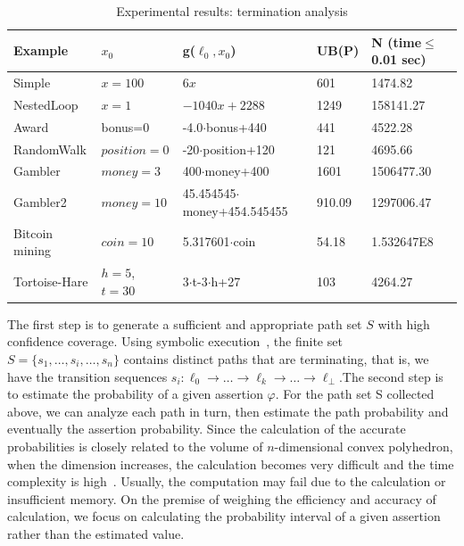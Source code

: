 \documentclass[sigconf,review, anonymous]{acmart}
\begin{document}
\begin{table}[htb]
	\caption{Experimental results: termination analysis}  
	\label{TerminationResult} 
	\begin{center}  
		\begin{tabular}{|l|l|l|l|l|}  
			\hline  	
			Example & $x_0$ & g($\ell_0,x_0$) & UB(P) & N (time$\leq$0.01 sec)\\ \hline  	
			Simple & $x=100$  & $6x$ & 601 & 1474.82 \\ \hline  		
			NestedLoop & $x=1$ & $-1040x+2288$ & 1249 & 158141.27 \\  \hline  
			Award & bonus=0 & -4.0$\cdot$bonus+440& 441 &4522.28 \\  \hline  
			RandomWalk & $position=0$ & -20$\cdot$position+120 & 121 & 4695.66 \\  \hline  
			Gambler& $money=3$ & 400$\cdot$money+400& 1601 & 1506477.30 \\ \hline  		 
			Gambler2 & $money=10$ & 45.454545$\cdot$money+454.545455 & 910.09 & 1297006.47 \\  \hline  
			Bitcoin mining & $coin=10$ & 5.317601$\cdot$coin & 54.18 & 1.532647E8 \\  \hline 
			Tortoise-Hare & $h=5$, $t=30$ & 3$\cdot$t-3$\cdot$h+27 & 103 & 4264.27 \\  \hline  
		\end{tabular}  
	\end{center}  
\end{table}

The first step is to generate a sufficient and appropriate path set $S$ with high confidence coverage. Using symbolic execution~\cite{Geldenhuys2012symbolic}, the finite set $S=\{s_1,\dots,s_i,\dots,s_n\}$ contains distinct paths that are terminating, that is, we have the transition sequences $s_i: \ell_0 \to \dots \to \ell_k \to \dots \to \ell_{\bot}$.The second step is to estimate the probability of a given assertion $\varphi$. For the path set S collected above, we can analyze each path in turn, then estimate the path probability and eventually the assertion probability. Since the calculation of the accurate probabilities is closely related to the volume of $n$-dimensional convex polyhedron, when the dimension increases, the calculation becomes very difficult and the time complexity is high~\cite{Arora1998Proof}. Usually, the computation may fail due to the calculation or insufficient memory. On the premise of weighing the efficiency and accuracy of calculation, we focus on calculating the probability interval of a given assertion rather than the estimated value.
\end{document}
